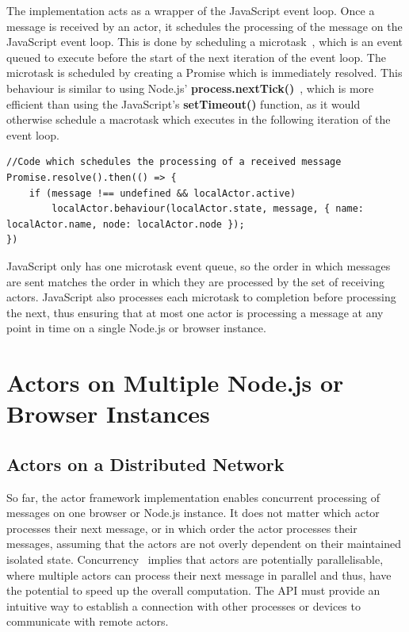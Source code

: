 \documentclass[oneside]{um-fict}
\begin{document}
The implementation acts as a wrapper of the JavaScript event loop. Once a message is received by an actor, it schedules the processing of the message on the JavaScript event loop. This is done by scheduling a microtask~\cite{microtasks}, which is an event queued to execute before the start of the next iteration of the event loop. The microtask is scheduled by creating a Promise which is immediately resolved. This behaviour is similar to using Node.js' \textbf{process.nextTick()}~\cite{nexttick}, which is more efficient than using the JavaScript's \textbf{setTimeout()} function, as it would otherwise schedule a macrotask which executes in the following iteration of the event loop.
\newpage
\begin{lstlisting}
//Code which schedules the processing of a received message
Promise.resolve().then(() => {
    if (message !== undefined && localActor.active)
        localActor.behaviour(localActor.state, message, { name: localActor.name, node: localActor.node });
})
\end{lstlisting}

JavaScript only has one microtask event queue, so the order in which messages are sent matches the order in which they are processed by the set of receiving actors. JavaScript also processes each microtask to completion before processing the next, thus ensuring that at most one actor is processing a message at any point in time on a single Node.js or browser instance.

\section{Actors on Multiple Node.js or Browser Instances}
\subsection{Actors on a Distributed Network}
So far, the actor framework implementation enables concurrent processing of messages on one browser or Node.js instance. It does not matter which actor processes their next message, or in which order the actor processes their messages, assuming that the actors are not overly dependent on their maintained isolated state. Concurrency~\cite{concurrencyjs, concurrency} implies that actors are potentially parallelisable, where multiple actors can process their next message in parallel and thus, have the potential to speed up the overall computation. The API must provide an intuitive way to establish a connection with other processes or devices to communicate with remote actors.
\end{document}
